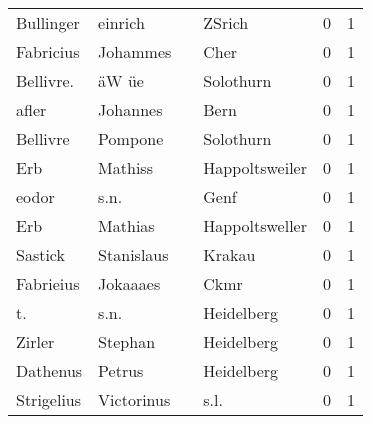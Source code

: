 \documentclass[10pt,a4paper,landscape]{article}
\begin{document}
\begin{longtable}{llllrr}
                Bullinger &                            einrich &             &                                      ZSrich &          0 &         1 \\
                Fabricius &                           Johammes &             &                                        Cher &          0 &         1 \\
                Bellivre. &                              äW üe &             &                                   Solothurn &          0 &         1 \\
                    afler &                           Johannes &             &                                        Bern &          0 &         1 \\
                 Bellivre &                            Pompone &             &                                   Solothurn &          0 &         1 \\
                      Erb &                            Mathiss &             &                              Happoltsweiler &          0 &         1 \\
                    eodor &                               s.n. &             &                                        Genf &          0 &         1 \\
                      Erb &                            Mathias &             &                              Happoltsweller &          0 &         1 \\
                  Sastick &                         Stanislaus &             &                                      Krakau &          0 &         1 \\
                Fabrieius &                           Jokaaaes &             &                                        Ckmr &          0 &         1 \\
                       t. &                               s.n. &             &                                  Heidelberg &          0 &         1 \\
                   Zirler &                            Stephan &             &                                  Heidelberg &          0 &         1 \\
                 Dathenus &                             Petrus &             &                                  Heidelberg &          0 &         1 \\
               Strigelius &                         Victorinus &             &                                        s.l. &          0 &         1 \\

\end{longtable}
\end{document}
